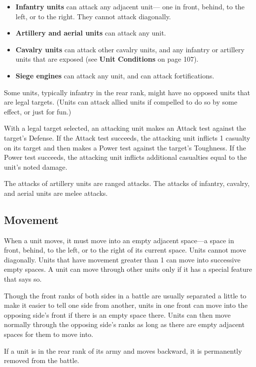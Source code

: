 \documentclass[10pt,a4paper,twoside,bg=print,twocolumn,openany,nodeprecatedcode]{dndbook}
\begin{document}
\begin{itemize}
\item \textbf{Infantry units} can attack any adjacent unit— one in front, behind, to the left, or to the right. They cannot attack diagonally.
\item \textbf{Artillery and aerial units} can attack any unit.
\item \textbf{Cavalry units} can attack other cavalry units, and any infantry or artillery units that are exposed (see \textbf{Unit Conditions} on page 107).
\item \textbf{Siege engines} can attack any unit, and can attack fortifications.
\end{itemize}

Some units, typically infantry in the rear rank, might have no opposed units that are legal targets. (Units can attack allied units if compelled to do so by some effect, or just for fun.)

With a legal target selected, an attacking unit makes an Attack test against the target's Defense. If the Attack test succeeds, the attacking unit inflicts 1 casualty on its target and then makes a Power test against the target's Toughness. If the Power test succeeds, the attacking unit inflicts additional casualties equal to the unit's noted damage.

The attacks of artillery units are ranged attacks. The attacks of infantry, cavalry, and aerial units are melee attacks.

\subsection{Movement}
When a unit moves, it must move into an empty adjacent space—a space in front, behind, to the left, or to the right of its current space. Units cannot move diagonally. Units that have movement greater than 1 can move into successive empty spaces. A unit can move through other units only if it has a special feature that says so.

Though the front ranks of both sides in a battle are usually separated a little to make it easier to tell one side from another, units in one front can move into the opposing side's front if there is an empty space there. Units can then move normally through the opposing side's ranks as long as there are empty adjacent spaces for them to move into.

If a unit is in the rear rank of its army and moves backward, it is permanently removed from the battle.
\end{document}
